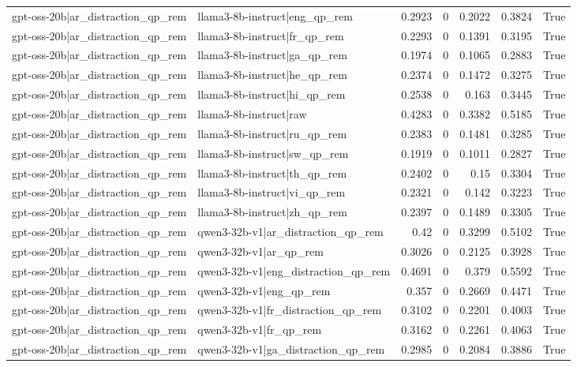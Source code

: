 \begin{table}
\begin{tabular}{l l r r r r l}
gpt-oss-20b|ar_distraction_qp_rem & llama3-8b-instruct|eng_qp_rem & 0.2923 & 0 & 0.2022 & 0.3824 & True \\
gpt-oss-20b|ar_distraction_qp_rem & llama3-8b-instruct|fr_qp_rem & 0.2293 & 0 & 0.1391 & 0.3195 & True \\
gpt-oss-20b|ar_distraction_qp_rem & llama3-8b-instruct|ga_qp_rem & 0.1974 & 0 & 0.1065 & 0.2883 & True \\
gpt-oss-20b|ar_distraction_qp_rem & llama3-8b-instruct|he_qp_rem & 0.2374 & 0 & 0.1472 & 0.3275 & True \\
gpt-oss-20b|ar_distraction_qp_rem & llama3-8b-instruct|hi_qp_rem & 0.2538 & 0 & 0.163 & 0.3445 & True \\
gpt-oss-20b|ar_distraction_qp_rem & llama3-8b-instruct|raw & 0.4283 & 0 & 0.3382 & 0.5185 & True \\
gpt-oss-20b|ar_distraction_qp_rem & llama3-8b-instruct|ru_qp_rem & 0.2383 & 0 & 0.1481 & 0.3285 & True \\
gpt-oss-20b|ar_distraction_qp_rem & llama3-8b-instruct|sw_qp_rem & 0.1919 & 0 & 0.1011 & 0.2827 & True \\
gpt-oss-20b|ar_distraction_qp_rem & llama3-8b-instruct|th_qp_rem & 0.2402 & 0 & 0.15 & 0.3304 & True \\
gpt-oss-20b|ar_distraction_qp_rem & llama3-8b-instruct|vi_qp_rem & 0.2321 & 0 & 0.142 & 0.3223 & True \\
gpt-oss-20b|ar_distraction_qp_rem & llama3-8b-instruct|zh_qp_rem & 0.2397 & 0 & 0.1489 & 0.3305 & True \\
gpt-oss-20b|ar_distraction_qp_rem & qwen3-32b-v1|ar_distraction_qp_rem & 0.42 & 0 & 0.3299 & 0.5102 & True \\
gpt-oss-20b|ar_distraction_qp_rem & qwen3-32b-v1|ar_qp_rem & 0.3026 & 0 & 0.2125 & 0.3928 & True \\
gpt-oss-20b|ar_distraction_qp_rem & qwen3-32b-v1|eng_distraction_qp_rem & 0.4691 & 0 & 0.379 & 0.5592 & True \\
gpt-oss-20b|ar_distraction_qp_rem & qwen3-32b-v1|eng_qp_rem & 0.357 & 0 & 0.2669 & 0.4471 & True \\
gpt-oss-20b|ar_distraction_qp_rem & qwen3-32b-v1|fr_distraction_qp_rem & 0.3102 & 0 & 0.2201 & 0.4003 & True \\
gpt-oss-20b|ar_distraction_qp_rem & qwen3-32b-v1|fr_qp_rem & 0.3162 & 0 & 0.2261 & 0.4063 & True \\
gpt-oss-20b|ar_distraction_qp_rem & qwen3-32b-v1|ga_distraction_qp_rem & 0.2985 & 0 & 0.2084 & 0.3886 & True \\

\end{tabular}
\end{table}
